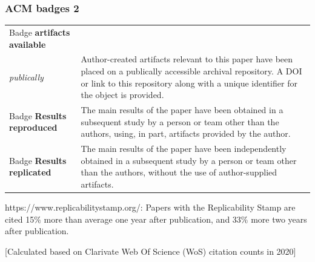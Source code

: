 \begin{frame}
\frametitle{ACM badges 2}

\begin{tabular}{|p{5cm}|p{9cm}|}
   \hline 
Badge \textbf{artifacts available} \\ \textit{publically} & Author-created artifacts relevant to this paper have been placed on a publically accessible archival repository. A DOI or link to this repository along with a unique identifier for the object is provided. \\
  \hline
Badge \textbf{Results reproduced}& The main results of the paper have been obtained in a subsequent study by a person or team other than the authors, using, in part, artifacts provided by the author. \\
  \hline
Badge \textbf{Results replicated} & The main results of the paper have been independently obtained in a subsequent study by a person or team other than the authors, without the use of author-supplied artifacts. \\ 
  \hline 
\end{tabular}
https://www.replicabilitystamp.org/: Papers with the Replicability Stamp are cited 15$\%$ more than average one year after publication, and 33$\%$ more two years after publication.

[Calculated based on Clarivate Web Of Science (WoS) citation counts in 2020]

\end{frame}


